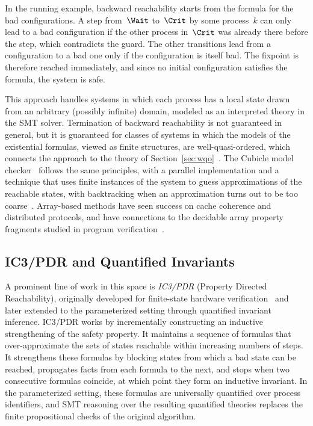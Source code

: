 In the running example, backward reachability starts from the formula for the
bad configurations. A step from~$\Wait$ to~$\Crit$ by some process~$k$ can
only lead to a bad configuration if the other process in~$\Crit$ was already
there before the step, which contradicts the guard. The other transitions
lead from a configuration to a bad one only if the configuration is itself
bad. The fixpoint is therefore reached immediately, and since no initial
configuration satisfies the formula, the system is safe.

This approach handles systems in which each process has a local state drawn
from an arbitrary (possibly infinite) domain, modeled as an interpreted theory
in the SMT solver. Termination of backward reachability is not guaranteed in
general, but it is guaranteed for classes of systems in which the models of
the existential formulas, viewed as finite structures, are well-quasi-ordered,
which connects the approach to the theory of Section~\ref{sec:wqo}~\cite{GR10}.
The Cubicle model checker~\cite{CGKMZ12} follows the same principles, with a
parallel implementation and a technique that uses finite instances of the
system to guess approximations of the reachable states, with backtracking
when an approximation turns out to be too coarse~\cite{CGKMZ13}. Array-based
methods have seen success on cache coherence and distributed protocols, and
have connections to the decidable array property fragments studied in program
verification~\cite{BMS06}.

\subsection{IC3/PDR and Quantified Invariants}

A prominent line of work in this space is \emph{IC3/PDR} (Property Directed
Reachability), originally developed for finite-state hardware
verification~\cite{Bra11,EMB11} and later extended to the parameterized
setting through quantified invariant inference. IC3/PDR works by incrementally
constructing an inductive strengthening of the safety property. It maintains
a sequence of formulas that over-approximate the sets of states reachable
within increasing numbers of steps. It strengthens these formulas by blocking
states from which a bad state can be reached, propagates facts from each
formula to the next, and stops when two consecutive formulas coincide, at
which point they form an inductive invariant.
In the parameterized setting, these formulas are universally quantified over
process identifiers, and SMT reasoning over the resulting quantified theories
replaces the finite propositional checks of the original algorithm.

